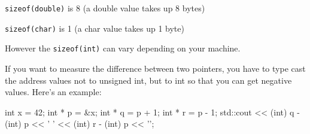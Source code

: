 \texttt{sizeof(double)}      is 8 (a double value takes up 8 bytes)

\texttt{sizeof(char)}        is 1 (a char value takes up 1 byte)

However the \texttt{sizeof(int)} can vary depending on your machine.

If you want to measure the difference between two pointers, you have to type cast the address values not to unsigned int, but to int so that you can get negative values. Here's an example:

\begin{consolethree}[escapeinside=||]
int x = 42;
int * p = &x;
int * q = p + 1;
int * r = p - 1;
std::cout << (int) q - (int) p << ' '
          << (int) r - (int) p << '\n';
\end{consolethree}










